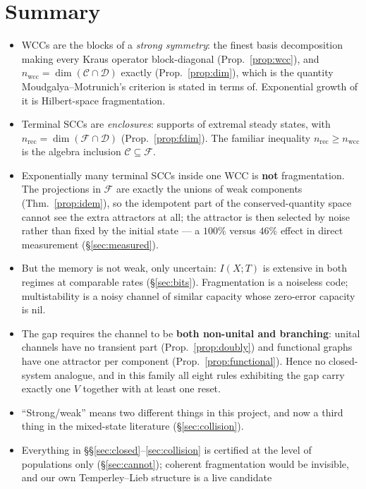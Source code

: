 \documentclass[11pt]{article}
\theoremstyle{plain}
\theoremstyle{definition}
\theoremstyle{remark}
\begin{document}
\section{Summary}

\begin{itemize}
\item WCCs are the blocks of a \emph{strong symmetry}: the finest basis
decomposition making every Kraus operator block-diagonal
(Prop.~\ref{prop:wcc}), and $n_{\mathrm{wcc}} = \dim(\mathcal{C}\cap
\mathcal{D})$ exactly (Prop.~\ref{prop:dim}), which is the quantity
Moudgalya--Motrunich's criterion is stated in terms of. Exponential growth of
it is Hilbert-space fragmentation.
\item Terminal SCCs are \emph{enclosures}: supports of extremal steady states,
with $n_{\mathrm{rec}} = \dim(\mathcal{F}\cap\mathcal{D})$
(Prop.~\ref{prop:fdim}). The familiar inequality $n_{\mathrm{rec}} \ge
n_{\mathrm{wcc}}$ is the algebra inclusion $\mathcal{C}\subseteq\mathcal{F}$.
\item Exponentially many terminal SCCs inside one WCC is \textbf{not}
fragmentation. The projections in $\mathcal{F}$ are exactly the unions of weak
components (Thm.~\ref{prop:idem}), so the idempotent part of the
conserved-quantity space cannot see the extra attractors at all; the attractor
is then selected by noise rather than fixed by the initial state --- a $100\%$
versus $46\%$ effect in direct measurement (\S\ref{sec:measured}).
\item But the memory is not weak, only uncertain: $I(X;T)$ is extensive in both
regimes at comparable rates (\S\ref{sec:bits}). Fragmentation is a noiseless
code; multistability is a noisy channel of similar capacity whose zero-error
capacity is nil.
\item The gap requires the channel to be \textbf{both non-unital and
branching}: unital channels have no transient part
(Prop.~\ref{prop:doubly}) and functional graphs have one attractor per
component (Prop.~\ref{prop:functional}). Hence no closed-system analogue, and
in this family all eight rules exhibiting the gap carry exactly one $V$
together with at least one reset.
\item ``Strong/weak'' means two different things in this project, and now a
third thing in the mixed-state literature (\S\ref{sec:collision}).
\item Everything in \S\S\ref{sec:closed}--\ref{sec:collision} is certified at
the level of populations only (\S\ref{sec:cannot}); coherent fragmentation
would be invisible, and our own Temperley--Lieb structure is a live candidate

\end{itemize}
\end{document}
